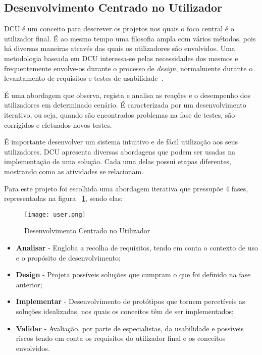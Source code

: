 \subsection*{Desenvolvimento Centrado no Utilizador}

DCU é um conceito para descrever os projetos nos quais o foco central é o utilizador final. É ao mesmo tempo uma filosofia ampla com vários métodos, pois há diversas maneiras através das quais os utilizadores são envolvidos. Uma metodologia baseada em DCU interessa-se pelas necessidades dos mesmos e frequentemente envolve-os durante o processo de \textit{design}, normalmente durante o levantamento de requisitos e testes de usabilidade~\cite{Abras2004}.

É uma abordagem que observa, regista e analisa as reações e o desempenho dos utilizadores em determinado cenário. É caracterizada por um desenvolvimento iterativo, ou seja, quando são encontrados problemas na fase de testes, são corrigidos e efetuados novos testes.

É importante desenvolver um sistema intuitivo e de fácil utilização aos seus utilizadores. DCU apresenta diversas abordagens que podem ser usadas na implementação de uma solução. Cada uma delas possui etapas diferentes, mostrando como as atividades se relacionam. 

Para este projeto foi escolhida uma abordagem iterativa que pressupõe 4 fases, representadas na figura ~\ref{fig:user-center}, sendo elas:

\begin{figure}[h]
\centering
\texttt{[image: user.png]}
\caption[Desenvolvimento Centrado no Utilizador] {Desenvolvimento Centrado no Utilizador\protect\footnotemark}
\label{fig:user-center}
\end{figure}


\begin{itemize}
\item \textbf{Analisar} - Engloba a recolha de requisitos, tendo em conta o contexto de uso e o propósito de desenvolvimento;
\item \textbf{Design} - Projeta possíveis soluções que cumpram o que foi definido na fase anterior;
\item \textbf{Implementar} - Desenvolvimento de protótipos que tornem percetíveis as soluções idealizadas, nos quais os conceitos têm de ser implementados;
\item \textbf{Validar} - Avaliação, por parte de especialistas, da usabilidade e possíveis riscos tendo em conta os requisitos do utilizador final e os conceitos envolvidos.
\end{itemize} 

